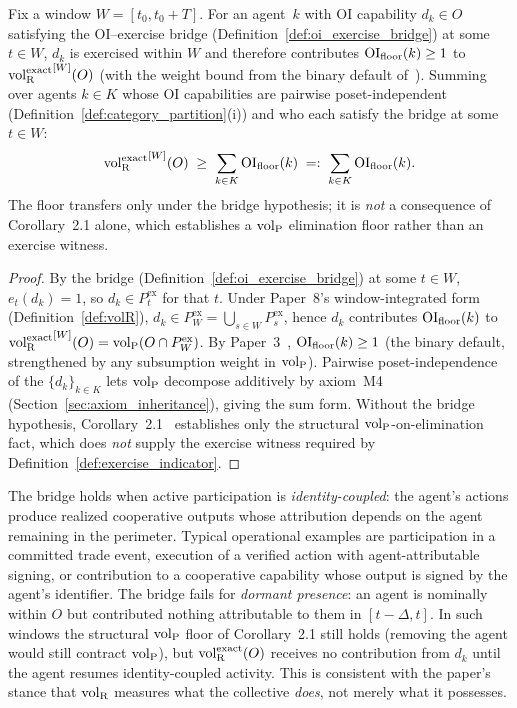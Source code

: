 \begin{proposition}
\label{prop:oi_floor}
Fix a window $W = [t_0, t_0 + T]$.  For an agent~$k$ with OI
capability $d_k \in O$ satisfying the OI--exercise bridge
(Definition~\ref{def:oi_exercise_bridge}) at some $t \in W$,
$d_k$ is exercised within $W$ and therefore contributes
$\mathrm{OI}_{\mathrm{floor}}(k) \geq 1$ to ${\operatorname{vol}_{\mathrm{R}}^{\mathrm{exact}}}^{[W]}(O)$ (with the weight
bound from the binary default
of~\citep[Corollary~2.1]{lasser2026horizon}).  Summing over
agents $k \in K$ whose OI capabilities are pairwise
poset-independent (Definition~\ref{def:category_partition}(i))
and who each satisfy the bridge at some $t \in W$:
\[
  {\operatorname{vol}_{\mathrm{R}}^{\mathrm{exact}}}^{[W]}(O) \;\geq\; \sum_{k \in K} \mathrm{OI}_{\mathrm{floor}}(k)
  \;=:\; \sum_{k \in K} \mathrm{OI}_{\mathrm{floor}}(k).
\]
The floor transfers only under the bridge hypothesis; it is
\emph{not} a consequence of Corollary~2.1 alone, which
establishes a ${\operatorname{vol}_{\mathrm{P}}}$ elimination floor rather than an exercise
witness.
\end{proposition}

\begin{proof}
By the bridge (Definition~\ref{def:oi_exercise_bridge}) at some
$t \in W$, $e_t(d_k) = 1$, so $d_k \in P^{\mathrm{ex}}_t$ for
that $t$.  Under Paper~8's window-integrated form
(Definition~\ref{def:volR}), $d_k \in P^{\mathrm{ex}}_W =
\bigcup_{s \in W} P^{\mathrm{ex}}_s$, hence $d_k$ contributes
$\mathrm{OI}_{\mathrm{floor}}(k)$ to ${\operatorname{vol}_{\mathrm{R}}^{\mathrm{exact}}}^{[W]}(O) = {\operatorname{vol}_{\mathrm{P}}}(O \cap
P^{\mathrm{ex}}_W)$.  By
Paper~3~\citep[Corollary~2.1]{lasser2026horizon},
$\mathrm{OI}_{\mathrm{floor}}(k) \geq 1$ (the binary default, strengthened by any
subsumption weight in ${\operatorname{vol}_{\mathrm{P}}}$).  Pairwise poset-independence of
the $\{d_k\}_{k \in K}$ lets ${\operatorname{vol}_{\mathrm{P}}}$ decompose additively by
axiom~M4 (Section~\ref{sec:axiom_inheritance}), giving the sum
form.  Without the bridge hypothesis,
Corollary~2.1~\citep{lasser2026horizon} establishes only the
structural ${\operatorname{vol}_{\mathrm{P}}}$-on-elimination fact, which does \emph{not}
supply the exercise witness required by
Definition~\ref{def:exercise_indicator}.
\end{proof}

\begin{remark}
\label{rem:oi_bridge_scope}
The bridge holds when active participation is
\emph{identity-coupled}: the agent's actions produce realized
cooperative outputs whose attribution depends on the agent
remaining in the perimeter.  Typical operational examples are
participation in a committed trade event, execution of a
verified action with agent-attributable signing, or
contribution to a cooperative capability whose output is signed
by the agent's identifier.  The bridge fails for \emph{dormant
presence}: an agent is nominally within $O$ but contributed
nothing attributable to them in $[t-\Delta, t]$.  In such
windows the structural ${\operatorname{vol}_{\mathrm{P}}}$ floor of Corollary~2.1 still
holds (removing the agent would still contract ${\operatorname{vol}_{\mathrm{P}}}$), but
${\operatorname{vol}_{\mathrm{R}}^{\mathrm{exact}}}(O)$ receives no contribution from $d_k$ until the
agent resumes identity-coupled activity.  This is consistent
with the paper's stance that ${\operatorname{vol}_{\mathrm{R}}}$ measures what the
collective \emph{does}, not merely what it possesses.
\end{remark}

